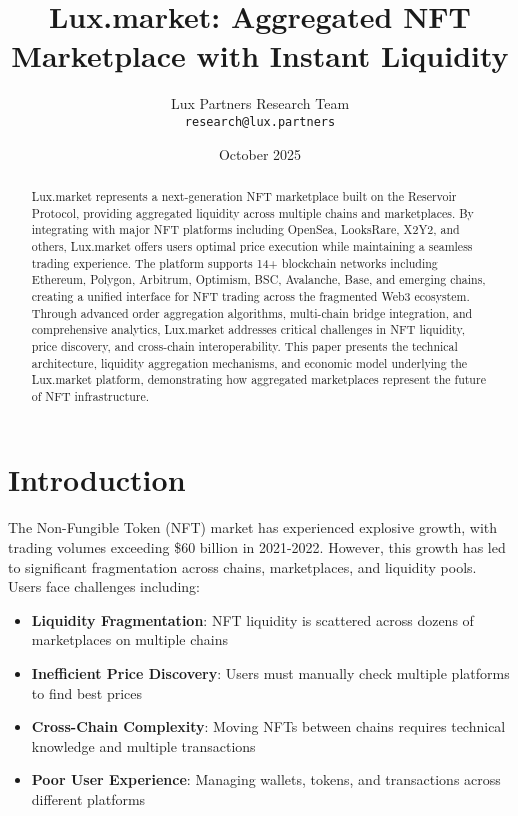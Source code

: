 \documentclass[11pt,a4paper]{article}
\title{Lux.market: Aggregated NFT Marketplace with Instant Liquidity}
\author{Lux Partners Research Team\\
\texttt{research@lux.partners}}
\date{October 2025}
\begin{document}
\maketitle

\begin{abstract}
Lux.market represents a next-generation NFT marketplace built on the Reservoir Protocol, providing aggregated liquidity across multiple chains and marketplaces. By integrating with major NFT platforms including OpenSea, LooksRare, X2Y2, and others, Lux.market offers users optimal price execution while maintaining a seamless trading experience. The platform supports 14+ blockchain networks including Ethereum, Polygon, Arbitrum, Optimism, BSC, Avalanche, Base, and emerging chains, creating a unified interface for NFT trading across the fragmented Web3 ecosystem. Through advanced order aggregation algorithms, multi-chain bridge integration, and comprehensive analytics, Lux.market addresses critical challenges in NFT liquidity, price discovery, and cross-chain interoperability. This paper presents the technical architecture, liquidity aggregation mechanisms, and economic model underlying the Lux.market platform, demonstrating how aggregated marketplaces represent the future of NFT infrastructure.
\end{abstract}

\section{Introduction}

The Non-Fungible Token (NFT) market has experienced explosive growth, with trading volumes exceeding \$60 billion in 2021-2022. However, this growth has led to significant fragmentation across chains, marketplaces, and liquidity pools. Users face challenges including:

\begin{itemize}
\item \textbf{Liquidity Fragmentation}: NFT liquidity is scattered across dozens of marketplaces on multiple chains
\item \textbf{Inefficient Price Discovery}: Users must manually check multiple platforms to find best prices
\item \textbf{Cross-Chain Complexity}: Moving NFTs between chains requires technical knowledge and multiple transactions
\item \textbf{Poor User Experience}: Managing wallets, tokens, and transactions across different platforms
\end{itemize}
\end{document}

